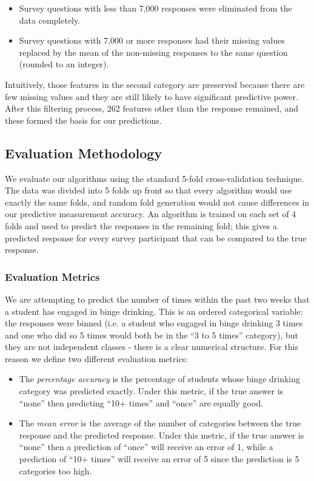 \begin{itemize}
\item Survey questions with less than 7,000 responses were eliminated from the data completely.
\item Survey questions with 7,000 or more responses had their missing values replaced by the mean of the non-missing responses to the same question (rounded to an integer).
\end{itemize}

Intuitively, those features in the second category are preserved because there are few missing values and they are still likely to have significant predictive power.  After this filtering process, 262 features other than the response remained, and these formed the basis for our predictions.

\subsection{Evaluation Methodology}

We evaluate our algorithms using the standard 5-fold cross-validation technique.  The data was divided into 5 folds up front so that every algorithm would use exactly the same folds, and random fold generation would not cause differences in our predictive measurement accuracy.  An algorithm is trained on each set of 4 folds and used to predict the responses in the remaining fold; this gives a predicted response for every survey participant that can be compared to the true response.

\subsubsection{Evaluation Metrics}

We are attempting to predict the number of times within the past two weeks that a student has engaged in binge drinking.  This is an ordered categorical variable: the responses were binned (i.e. a student who engaged in binge drinking 3 times and one who did so 5 times would both be in the ``3 to 5 times'' category), but they are not independent classes - there is a clear numerical structure.  For this reason we define two different evaluation metrics:

\begin{itemize}
\item The \emph{percentage accuracy} is the percentage of students whose binge drinking category was predicted exactly.  Under this metric, if the true answer is ``none'' then predicting ``10+ times'' and ``once'' are equally good.
\item The \emph{mean error} is the average of the number of categories between the true response and the predicted response. Under this metric, if the true answer is ``none'' then a prediction of ``once'' will receive an error of 1, while a prediction of ``10+ times'' will receive an error of 5 since the prediction is 5 categories too high.
\end{itemize}

